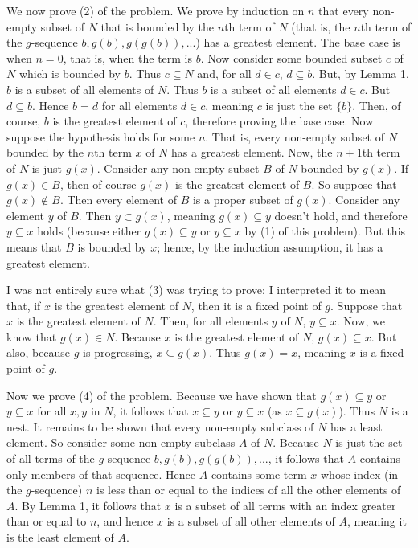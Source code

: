 \documentclass{article}
\theoremstyle{definition}
\begin{document}
We now prove (2) of the problem. We prove by induction on $n$ that every non-empty subset of $N$ that is bounded by the $n$th term of $N$ (that is, the $n$th term 
of the $g$-sequence $b,g(b),g(g(b)),...$) has a greatest element. The base case is when $n=0$, that is, when the term is $b$. Now consider some 
bounded subset $c$ of $N$ which is bounded by $b$. Thus $c\subseteq N$ and, for all $d\in c$, $d\subseteq b$. But, by Lemma 1, $b$ is a subset of all elements of 
$N$. Thus $b$ is a subset of all elements $d\in c$. But $d\subseteq b$. Hence $b=d$ for all elements $d\in c$, meaning $c$ is just the set 
$\{ b\}$. Then, of course, $b$ is the greatest element of $c$, therefore proving the base case. Now suppose the hypothesis holds for some $n$. That is, 
every non-empty subset of $N$ bounded by the $n$th term $x$ of $N$ has a greatest element. Now, the $n+1$th term of $N$ is just $g(x)$. Consider any non-empty 
subset $B$ of $N$ bounded by $g(x)$. If $g(x)\in B$, then of course $g(x)$ is the greatest element of $B$. So suppose that $g(x)\notin B$. Then every element of $B$ is a 
proper subset of $g(x)$. Consider any element $y$ of $B$. Then $y\subset g(x)$, meaning $g(x)\subseteq y$ doesn't hold, and therefore $y\subseteq x$ holds 
(because either $g(x)\subseteq y$ or $y\subseteq x$ by (1) of this problem). But this means that $B$ is bounded by $x$; hence, by the induction assumption, it has a 
greatest element. 


I was not entirely sure what (3) was trying to prove: I interpreted it to mean that, if $x$ is the greatest element of $N$, then it is a fixed point of $g$. 
Suppose that $x$ is the greatest element of $N$. Then, for all elements $y$ of $N$, $y\subseteq x$. Now, we know that 
$g(x)\in N$. Because $x$ is the greatest element of $N$, $g(x)\subseteq x$. But also, because $g$ is progressing, $x\subseteq g(x)$. Thus $g(x)=x$, meaning $x$ is a fixed 
point of $g$.

Now we prove (4) of the problem. Because we have shown that $g(x)\subseteq y$ or $y\subseteq x$ for all $x,y$ in $N$, it follows that $x\subseteq y$ or 
$y\subseteq x$ (as $x\subseteq g(x)$). Thus $N$ is a nest. It remains to be shown that every non-empty subclass of $N$ has a least element. So consider some non-empty 
subclass $A$ of $N$. Because $N$ is just the set of all terms of the $g$-sequence $b,g(b),g(g(b)),...$, it follows that $A$ contains only members of that sequence. 
Hence $A$ contains some term $x$ whose index (in the $g$-sequence) $n$ is less than or equal to the indices of all the other elements of $A$. By Lemma 1, it follows that 
$x$ is a subset of all terms with an index greater than or equal to $n$, and hence $x$ is a subset of all other elements of $A$, meaning it is the least element of $A$. 
\end{document}
